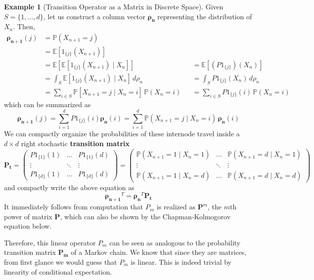 \documentclass{article}
\theoremstyle{definition}
\newtheorem{example}{Example}[section]
\theoremstyle{remark}
\theoremstyle{definition}
\begin{document}
\begin{example}[Transition Operator as a Matrix in Discrete Space]
Given $S = \{1, \ldots, d\}$, let us construct a column vector $\boldsymbol{\rho_n}$ representing the distribution of $X_n$. Then, 
\begin{align*}
    \boldsymbol{\rho_{n+1}} (j) & = \mathbb{P}(X_{n + 1} = j) \\
    & =  \mathbb{E}[1_{\{j\}} (X_{n+1})] \\
    & = \mathbb{E} [ \mathbb{E}[1_{\{j\}} (X_{n+1}) \mid X_n] ] && = \mathbb{E}[(P 1_{\{j\}}) (X_n)] \\
    & = \int_S \mathbb{E}[1_{\{j\}} (X_{n+1}) \mid X_n] \, d\rho_n && = \int_S P 1_{\{j\}} (X_n) \, d\rho_n \\
    & = \sum_{i \in S} \mathbb{P}[ X_{n+1} = j \mid X_n = i] \, \mathbb{P}(X_n = i) && = \sum_{i \in S} P 1_{\{j\}} (i) \, \mathbb{P}(X_n = i) 
\end{align*}
which can be summarized as 
\[\boldsymbol{\rho_{n + 1}} (j) = \sum_{i = 1}^d P 1_{\{j\}} (i) \boldsymbol{\rho_n} (i) = \sum_{i = 1}^d \mathbb{P}(X_{n+1} = j \mid X_n = i) \, \boldsymbol{\rho_n} (i)\]
We can compactly organize the probabilities of these internode travel inside a $d \times d$ right stochastic \textbf{transition matrix}
\[\mathbf{P_t} = \begin{pmatrix} P 1_{\{1\}} (1) & \ldots & P 1_{\{1\}} (d) \\ \vdots & \ddots & \vdots \\ P 1_{\{d\}} (1) & \ldots & P 1_{\{d\}} (d) \end{pmatrix} = \begin{pmatrix} \mathbb{P}(X_{n+1} = 1 \mid X_n = 1) & \ldots & \mathbb{P}(X_{n+1} = d \mid X_n = 1) \\ \vdots & \ddots & \vdots \\ \mathbb{P}(X_{n+1} = 1 \mid X_n = d) & \ldots & \mathbb{P}(X_{n+1} = d \mid X_n = d) \end{pmatrix} \]
and compactly write the above equation as 
\[\boldsymbol{\rho_{n + 1}}^T = \boldsymbol{\rho_{n}}^T \mathbf{P_t}\]
It immediately follows from computation that $P_m$ is realized as $\mathbf{P}^m$, the $m$th power of matrix $\mathbf{P}$, which can also be shown by the Chapman-Kolmogorov equation below. 
\end{example}

Therefore, this linear operator $P_m$ can be seen as analogous to the probability transition matrix $\mathbf{P_m}$ of a Markov chain. We know that since they are matrices, from first glance we would guess that $P_m$ is linear. This is indeed trivial by linearity of conditional expectation. 
\end{document}
